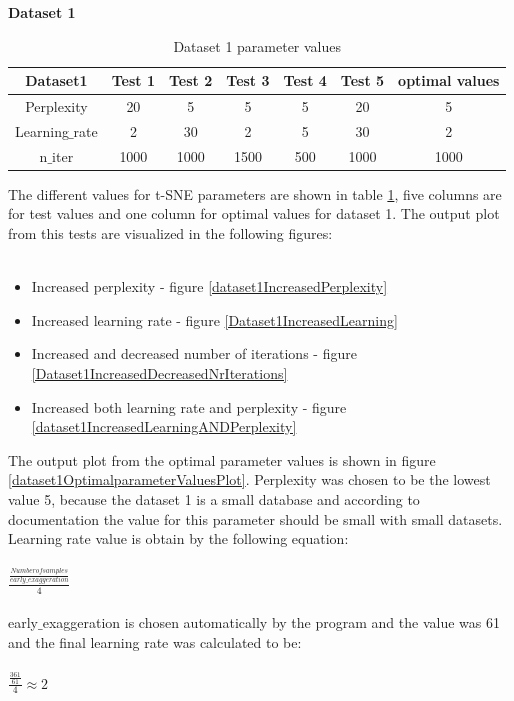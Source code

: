 \documentclass[12pt]{report}
\begin{document}
	\textbf{Dataset 1}
	\begin{table}[H]
		\centering
		\begin{tabular}{|c|c|c|c|c|c|c|}
			\hline
			Dataset1 & Test 1 & Test 2 & Test 3 & Test 4 & Test 5& optimal values \\
			\hline
			Perplexity & 20 & 5 & 5 & 5 & 20 & 5 \\
			\hline
			Learning$\_$rate & 2 & 30 & 2 & 5 & 30 & 2 \\
			\hline
			n$\_$iter & 1000 & 1000 & 1500 & 500 & 1000 & 1000 \\
			\hline
		\end{tabular}
		\caption{Dataset 1 parameter values}
		\label{dataset1ParameterValues}
	\end{table}
	The different values for t-SNE parameters are shown in table \ref{dataset1ParameterValues}, five columns are for test values and one column for optimal values for dataset 1. The output plot from this tests are visualized in the following figures:\\
	\\
	\begin{itemize}
		\item Increased perplexity - figure \ref{dataset1IncreasedPerplexity}
		\item Increased learning rate - figure \ref{Dataset1IncreasedLearning}
		\item Increased and decreased number of iterations - figure \ref{Dataset1IncreasedDecreasedNrIterations}
		\item Increased both learning rate and perplexity - figure \ref{dataset1IncreasedLearningANDPerplexity}
	\end{itemize}
	The output plot from the optimal parameter values is shown in figure \ref{dataset1OptimalparameterValuesPlot}. Perplexity was chosen to be the lowest value 5, because the dataset 1 is a small database and according to documentation the value for this parameter should be small with small datasets. Learning rate value is obtain by the following equation: \\
	\\
	$\frac{\frac{Number of samples}{early\_exaggeration}}{4}$\\
	\\
	early$\_$exaggeration is chosen automatically by the program and the value was 61 and the final learning rate was calculated to be:\\
	\\
	$\frac{\frac{361}{61}}{4} \approx 2$\\
\end{document}
